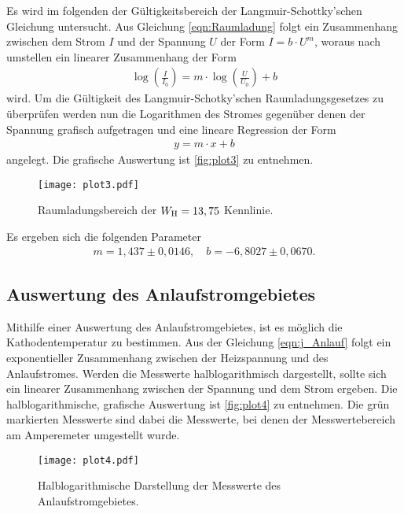 Es wird im folgenden der Gültigkeitsbereich der Langmuir-Schottky'schen Gleichung untersucht.
Aus Gleichung \eqref{eqn:Raumladung} folgt ein Zusammenhang zwischen dem Strom $I$ und der Spannung $U$ der Form $I=b\cdot U^m$, woraus nach umstellen ein linearer Zusammenhang der Form
\begin{align}
  \label{eqn:physLinReg}
  \log\left(\frac{I}{I_0}\right) = m \cdot \log\left(\frac{U}{U_0}\right) +b
\end{align}
wird. Um die Gültigkeit des Langmuir-Schotky'schen Raumladungsgesetzes zu überprüfen werden nun die Logarithmen des Stromes gegenüber denen der Spannung grafisch aufgetragen und
eine lineare Regression der Form
\begin{align}
  \label{eqn:linReg}
  y=m\cdot x+b
\end{align}
angelegt. Die grafische Auswertung ist \autoref{fig:plot3} zu entnehmen.

\begin{figure}[H]
  \centering
  \texttt{[image: plot3.pdf]}
  \caption{Raumladungsbereich der $W_{\text H} = 13,75$ Kennlinie.}
  \label{fig:plot3}
\end{figure}

\noindent
Es ergeben sich die folgenden Parameter
\begin{align*}
  m = 1,437 \pm 0,0146, \quad
  b = -6,8027 \pm 0,0670.
\end{align*}

\subsection{Auswertung des Anlaufstromgebietes}
\label{subsec:anlaufstrom}

Mithilfe einer Auswertung des Anlaufstromgebietes, ist es möglich die Kathodentemperatur zu bestimmen.
Aus der Gleichung \eqref{eqn:j_Anlauf} folgt ein exponentieller Zusammenhang zwischen der Heizspannung und des Anlaufstromes.
Werden die Messwerte halblogarithmisch dargestellt, sollte sich ein linearer Zusammenhang zwischen der Spannung und dem Strom ergeben.
Die halblogarithmische, grafische Auswertung ist \autoref{fig:plot4} zu entnehmen. Die grün markierten Messwerte sind dabei die Messwerte, bei denen der
Messwertebereich am Amperemeter umgestellt wurde.

\begin{figure}[H]
  \centering
  \texttt{[image: plot4.pdf]}
  \caption{Halblogarithmische Darstellung der Messwerte des Anlaufstromgebietes.}
  \label{fig:plot4}
\end{figure}

